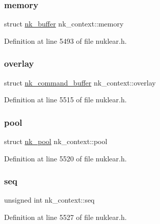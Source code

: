 \subsubsection{\texorpdfstring{memory}{memory}}
{\footnotesize\ttfamily struct \mbox{\hyperlink{structnk__buffer}{nk\+\_\+buffer}} nk\+\_\+context\+::memory}



Definition at line 5493 of file nuklear.\+h.

\mbox{\label{structnk__context_ae51cac633c54b94a63c8fe77b9558f4a}} 
\subsubsection{\texorpdfstring{overlay}{overlay}}
{\footnotesize\ttfamily struct \mbox{\hyperlink{structnk__command__buffer}{nk\+\_\+command\+\_\+buffer}} nk\+\_\+context\+::overlay}



Definition at line 5515 of file nuklear.\+h.

\mbox{\label{structnk__context_a84dcedd9a6418f47d22f39e2b20d741d}} 
\subsubsection{\texorpdfstring{pool}{pool}}
{\footnotesize\ttfamily struct \mbox{\hyperlink{structnk__pool}{nk\+\_\+pool}} nk\+\_\+context\+::pool}



Definition at line 5520 of file nuklear.\+h.

\mbox{\label{structnk__context_a4ca2377a51d98a451bdcc61ccd967820}} 
\subsubsection{\texorpdfstring{seq}{seq}}
{\footnotesize\ttfamily unsigned int nk\+\_\+context\+::seq}



Definition at line 5527 of file nuklear.\+h.

